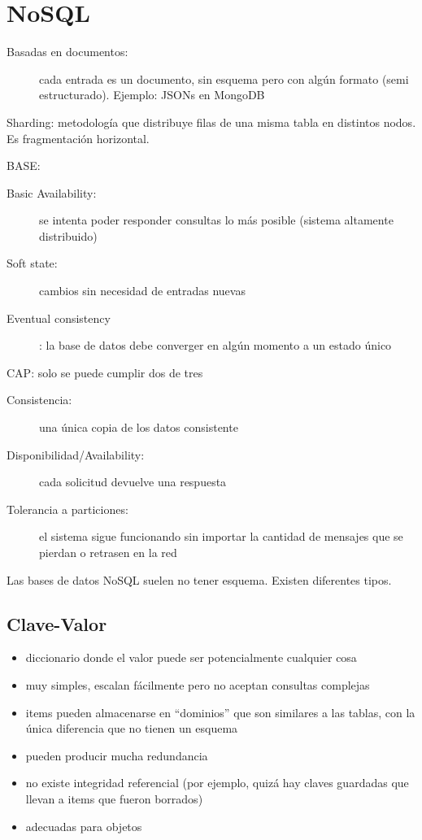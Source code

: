 \section{NoSQL}

\begin{description}
	\item[Basadas en documentos:] cada entrada es un documento, sin esquema pero con algún formato (semi estructurado). Ejemplo: JSONs en MongoDB
\end{description}

Sharding: metodología que distribuye filas de una misma tabla en distintos nodos. Es fragmentación horizontal.

BASE:

\begin{description}
	\item[Basic Availability:] se intenta poder responder consultas lo más posible (sistema altamente distribuido)
	\item[Soft state:] cambios sin necesidad de entradas nuevas
	\item[Eventual consistency]: la base de datos debe converger en algún momento a un estado único
\end{description}

CAP: solo se puede cumplir dos de tres

\begin{description}
	\item[Consistencia:] una única copia de los datos consistente
	\item[Disponibilidad/Availability:] cada solicitud devuelve una respuesta
	\item[Tolerancia a particiones:] el sistema sigue funcionando sin importar la cantidad de mensajes que se pierdan o retrasen en la red
\end{description}

Las bases de datos NoSQL suelen no tener esquema. Existen diferentes tipos.

\subsection{Clave-Valor}

\begin{itemize}
	\item diccionario donde el valor puede ser potencialmente cualquier cosa
	\item muy simples, escalan fácilmente pero no aceptan consultas complejas
	\item items pueden almacenarse en ``dominios'' que son similares a las tablas, con la única diferencia que no tienen un esquema
	\item pueden producir mucha redundancia
	\item no existe integridad referencial (por ejemplo, quizá hay claves guardadas que llevan a items que fueron borrados)
	\item adecuadas para objetos
\end{itemize}

